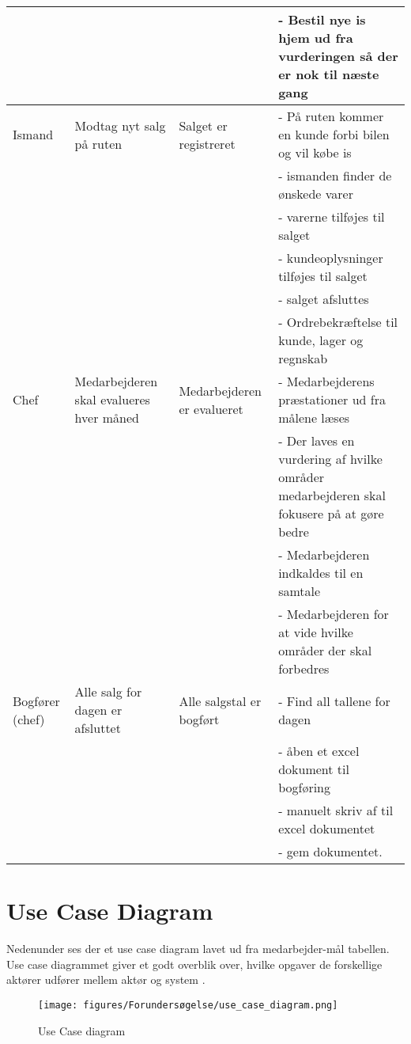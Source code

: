 \begin{center}
\begin{longtable}{ |p{90pt}|p{90pt}|p{90pt}|p{90pt}| }
    &&&
    - Bestil nye is hjem ud fra vurderingen så der er nok til næste gang \\
    \hline
    Ismand & Modtag nyt salg på ruten & Salget er registreret & 
    - På ruten kommer en kunde forbi bilen og vil købe is \\
    &&&
    - ismanden finder de ønskede varer \\
    &&&
    - varerne tilføjes til salget \\
    &&&
    - kundeoplysninger tilføjes til salget \\
    &&&
    - salget afsluttes \\
    &&&
    - Ordrebekræftelse til kunde, lager og regnskab \\
    \hline
    Chef & Medarbejderen skal evalueres hver måned & Medarbejderen er evalueret &
    - Medarbejderens præstationer ud fra målene læses \\
    &&&
    - Der laves en vurdering af hvilke områder medarbejderen skal fokusere på at gøre bedre \\
    &&&
    - Medarbejderen indkaldes til en samtale \\
    &&&
    - Medarbejderen for at vide hvilke områder der skal forbedres \\
    \hline
    Bogfører (chef) & Alle salg for dagen er afsluttet & Alle salgstal er bogført & 
    - Find all tallene for dagen \\
    &&&
    - åben et excel dokument til bogføring \\
    &&&
    - manuelt skriv af til excel dokumentet \\
    &&&
    - gem dokumentet. \\
    \hline
\end{longtable}
\end{center}

\section{Use Case Diagram}\label{usecase}
Nedenunder ses der et use case diagram lavet ud fra medarbejder-mål tabellen. Use case diagrammet giver et godt overblik over, hvilke opgaver de forskellige aktører udfører mellem aktør og system \cite{visual-paradigm.com}. 

\begin{figure}[H]
    \centering
    \texttt{[image: figures/Forundersøgelse/use\_case\_diagram.png]}
    \caption{Use Case diagram}
    \label{fig:usecasediagram}
\end{figure}

